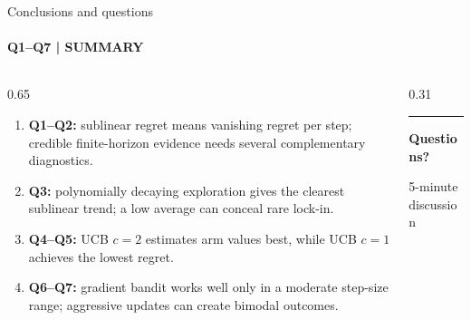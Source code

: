 \begin{frame}{Conclusions and questions}
  \framesubtitle{Q1--Q7 | SUMMARY}
  \vspace{0.08cm}
  \begin{columns}[T,onlytextwidth]
    \begin{column}{0.65\textwidth}
      \begin{enumerate}
        \item \textbf{Q1--Q2:} sublinear regret means vanishing regret per step; credible finite-horizon evidence needs several complementary diagnostics.
        \item \textbf{Q3:} polynomially decaying exploration gives the clearest sublinear trend; a low average can conceal rare lock-in.
        \item \textbf{Q4--Q5:} UCB \(c=2\) estimates arm values best, while UCB \(c=1\) achieves the lowest regret.
        \item \textbf{Q6--Q7:} gradient bandit works well only in a moderate step-size range; aggressive updates can create bimodal outcomes.
      \end{enumerate}
      \vspace{0.20cm}
    \end{column}
    \begin{column}{0.31\textwidth}
      \centering
      \vspace{0.42cm}
      {\color{Teal}\rule{0.82cm}{2.6pt}}\par
      \vspace{0.24cm}
      {\fontsize{25}{28}\selectfont\bfseries\color{Navy}Questions?}\par
      \vspace{0.18cm}
      {\fontsize{10.2}{12.4}\selectfont\color{Muted}5-minute discussion}
    \end{column}
  \end{columns}
\end{frame}
